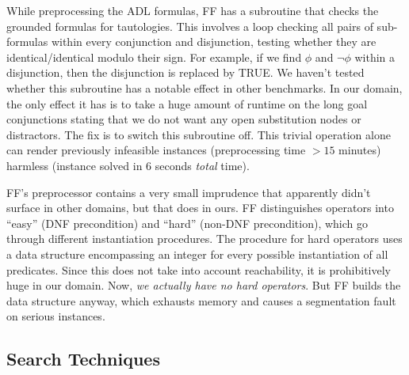 While preprocessing the ADL formulas, FF has a subroutine that
checks the grounded formulas
for tautologies. This involves a loop checking all pairs of
sub-formulas within every conjunction and disjunction, testing whether
they are identical/identical modulo their sign. For example, if we
find $\phi$ and $\neg \phi$ within a disjunction, then the disjunction
is replaced by TRUE. We haven't tested whether this subroutine has a
notable effect in other benchmarks. In our domain, the only effect it
has is to take a huge amount of runtime on the long goal conjunctions
stating that we do not want any open substitution nodes or
distractors. The fix is to switch this subroutine off. This trivial
operation alone can render previously infeasible instances
(preprocessing time $>15$ minutes) harmless (instance solved in $6$
seconds {\em total} time).



FF's preprocessor contains a very small imprudence that apparently
didn't surface in other domains, but that does in ours. FF
distinguishes operators into ``easy'' (DNF precondition) and ``hard''
(non-DNF precondition), which go through different instantiation
procedures. The procedure for hard operators uses a data structure
encompassing an integer for every possible instantiation of all
predicates. Since this does not take into account reachability, it is
prohibitively huge in our domain. Now, {\em we actually have no hard
  operators}. But FF builds the data structure anyway, which exhausts
memory and causes a segmentation fault on serious instances.




















\subsection{Search Techniques}
\label{sec:crisp-ff:preprocess:heuristics}





